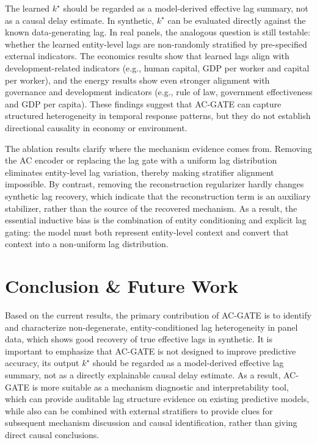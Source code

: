 \documentclass[conference]{IEEEtran}
\begin{document}
The learned $k^\star$ should be regarded as a model-derived effective lag summary, not as a causal delay estimate. In synthetic, $k^\star$ can be evaluated directly against the known data-generating lag. In real panels, the analogous question is still testable: whether the learned entity-level lags are non-randomly stratified by pre-specified external indicators. The economics results show that learned lags align with development-related indicators (e.g., human capital, GDP per worker and capital per worker), and the energy results show even stronger alignment with governance and development indicators (e.g., rule of law, government effectiveness and GDP per capita). These findings suggest that AC-GATE can capture structured heterogeneity in temporal response patterns, but they do not establish directional causality in economy or environment.

The ablation results clarify where the mechanism evidence comes from. Removing the AC encoder or replacing the lag gate with a uniform lag distribution eliminates entity-level lag variation, thereby making stratifier alignment impossible. By contrast, removing the reconstruction regularizer hardly changes synthetic lag recovery, which indicate that the reconstruction term is an auxiliary stabilizer, rather than the source of the recovered mechanism. As a result, the essential inductive bias is the combination of entity conditioning and explicit lag gating: the model must both represent entity-level context and convert that context into a non-uniform lag distribution.


\section{Conclusion \& Future Work}
Based on the current results, the primary contribution of AC-GATE is to identify and characterize non-degenerate, entity-conditioned lag heterogeneity in panel data, which shows good recovery of true effective lags in synthetic. It is important to emphasize that AC-GATE is not designed to improve predictive accuracy, its output $k^\star$ should be regarded as a  model-derived effective lag summary, not as a directly explainable causal delay estimate. As a result, AC-GATE is more suitable as a mechanism diagnostic and interpretability tool, which can provide auditable lag structure evidence on existing predictive models, while also can be combined with external stratifiers to provide clues for subsequent mechanism discussion and causal identification, rather than giving direct causal conclusions.
\end{document}
